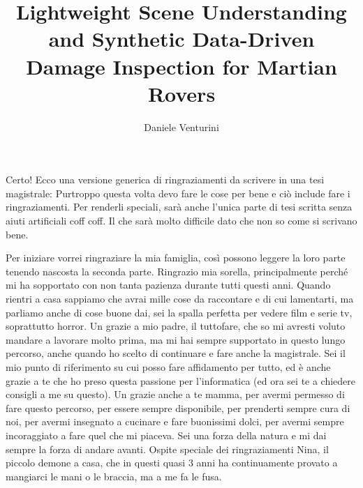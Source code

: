 \documentclass[binding=0.6cm]{sapthesis}
\title{Lightweight Scene Understanding and Synthetic Data-Driven Damage Inspection for Martian Rovers}
\author{Daniele Venturini}
\begin{document}
\frontmatter
\maketitle
\dedication{"Even if it's over now, \\ I'm glad we stopped to hear the music"}

\begin{acknowledgments}
	Certo! Ecco una versione generica di ringraziamenti da scrivere in una tesi magistrale:
	Purtroppo questa volta devo fare le cose per bene e ciò include fare i ringraziamenti. Per renderli speciali, sarà anche l'unica parte di tesi scritta senza aiuti artificiali coff coff.
	Il che sarà molto difficile dato che non so come si scrivano bene.

	Per iniziare vorrei ringraziare la mia famiglia, così possono leggere la loro parte tenendo nascosta la seconda parte.
	Ringrazio mia sorella, principalmente perché mi ha sopportato con non tanta pazienza durante tutti questi anni. Quando rientri a casa sappiamo che avrai mille cose da raccontare e di cui lamentarti, ma parliamo anche di cose buone dai, sei la spalla perfetta per vedere film e serie tv, soprattutto horror.
	Un grazie a mio padre, il tuttofare, che so mi avresti voluto mandare a lavorare molto prima, ma mi hai sempre supportato in questo lungo percorso, anche quando ho scelto di continuare e fare anche la magistrale. Sei il mio punto di riferimento su cui posso fare affidamento per tutto, ed è anche grazie a te che ho preso questa passione per l'informatica (ed ora sei te a chiedere consigli a me su questo).
	Un grazie anche a te mamma, per avermi permesso di fare questo percorso, per essere sempre disponibile, per prenderti sempre cura di noi, per avermi insegnato a cucinare e fare buonissimi dolci, per avermi sempre incoraggiato a fare quel che mi piaceva. Sei una forza della natura e mi dai sempre la forza di andare avanti.
	Ospite speciale dei ringraziamenti Nina, il piccolo demone a casa, che in questi quasi 3 anni ha continuamente provato a mangiarci le mani o le braccia, ma a me fa le fusa.


\end{acknowledgments}
\end{document}
